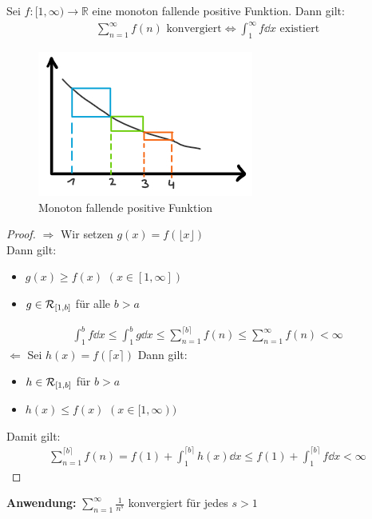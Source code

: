 \begin{Satz}{
	Sei $f : [1, \infty) \rightarrow \mathbb{R}$ eine monoton fallende 
	positive Funktion. 
	Dann gilt:
	\begin{align*}
		\sum_{n = 1}^{\infty} f(n) \text{ konvergiert} \Leftrightarrow 
		\int_1^{\infty} f \dd{x} \text{ existiert}
	\end{align*}
	\begin{figure}
	\centering
		\caption{Monoton fallende positive Funktion}
		\includegraphics[scale=0.3]{Skizzen/plot_monotone_fkt_integral}
	\end{figure}
}\end{Satz}

\begin{proof}
	$\Rightarrow$ Wir setzen $g(x) = f( \lfloor x \rfloor )$ \\
	Dann gilt:
	\begin{itemize}
		\item $g(x) \geq f(x)$ $(x \in [1, \infty])$
		\item $g \in \mathcal{R}_{[{1},{b}]}$ für alle $ b > a$
	\end{itemize}
	\begin{align*}
		\int_1^b f \dd{x} \leq \int_1^b g \dd{x} \leq \sum_{n = 1}^{\lceil b \rceil}
		f(n) \leq \sum_{n=1}^{\infty} f(n) < \infty 
	\end{align*}
	$\Leftarrow$ Sei $ h(x) = f(\lceil x \rceil )$ Dann gilt:
	\begin{itemize}
		\item $h \in \mathcal{R}_{[{1},{b}]} $ für $b >a$
		\item $h(x) \leq f(x) $ $ (x \in [1, \infty)) $
	\end{itemize}
	Damit gilt:
	\begin{align*}
		\sum_{n = 1}^{\lceil b \rceil }f(n) = f(1) + 
		\int_1^{\lceil b \rceil}h(x) \dd{x} 
		\leq f(1) + \int_1^{\lceil b \rceil} f \dd{x} < \infty
	\end{align*}
\end{proof}

\textbf{Anwendung:} $\sum_{n=1}^{\infty}\frac{1}{n^s}$ konvergiert für jedes $s > 1$

